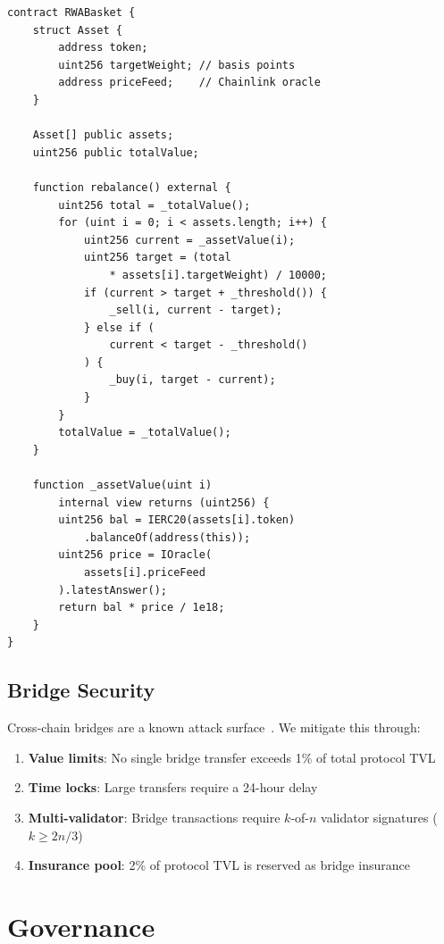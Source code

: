 \documentclass[11pt,letterpaper]{article}
\begin{document}
\begin{lstlisting}[language=Solidity,caption=RWABasket.sol]
contract RWABasket {
    struct Asset {
        address token;
        uint256 targetWeight; // basis points
        address priceFeed;    // Chainlink oracle
    }

    Asset[] public assets;
    uint256 public totalValue;

    function rebalance() external {
        uint256 total = _totalValue();
        for (uint i = 0; i < assets.length; i++) {
            uint256 current = _assetValue(i);
            uint256 target = (total
                * assets[i].targetWeight) / 10000;
            if (current > target + _threshold()) {
                _sell(i, current - target);
            } else if (
                current < target - _threshold()
            ) {
                _buy(i, target - current);
            }
        }
        totalValue = _totalValue();
    }

    function _assetValue(uint i)
        internal view returns (uint256) {
        uint256 bal = IERC20(assets[i].token)
            .balanceOf(address(this));
        uint256 price = IOracle(
            assets[i].priceFeed
        ).latestAnswer();
        return bal * price / 1e18;
    }
}
\end{lstlisting}

\subsection{Bridge Security}

Cross-chain bridges are a known attack surface~\cite{ronin}. We mitigate this through:

\begin{enumerate}
    \item \textbf{Value limits}: No single bridge transfer exceeds 1\% of total protocol TVL
    \item \textbf{Time locks}: Large transfers require a 24-hour delay
    \item \textbf{Multi-validator}: Bridge transactions require $k$-of-$n$ validator signatures ($k \geq 2n/3$)
    \item \textbf{Insurance pool}: 2\% of protocol TVL is reserved as bridge insurance
\end{enumerate}

\section{Governance}
\label{sec:governance}
\end{document}

